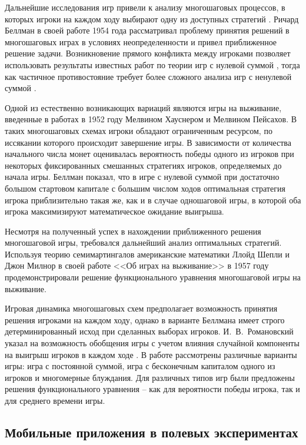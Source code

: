 Дальнейшие исследования игр привели к анализу многошаговых процессов, в которых игроки на каждом ходу выбирают одну из доступных стратегий \cite{bellman_decision_1954}. Ричард Беллман в своей работе 1954 года рассматривал проблему принятия решений в многошаговых играх в условиях неопределенности \cite{bellman_decision-making_1954} и привел приближенное решение задачи. Возникновение прямого конфликта между игроками позволяет использовать результаты известных работ по теории игр с нулевой суммой \cite{nash_non-cooperative_1951}, тогда как частичное противостояние требует более сложного анализа игр с ненулевой суммой \cite{bellman_non-zero_1949}. 

Одной из естественно возникающих вариаций являются игры на выживание, введенные в работах \cite{hausner_games_1952,peisakoff_more_1952} в 1952 году Мелвином Хауснером и Мелвином Пейсахов. В таких многошаговых схемах игроки обладают ограниченным ресурсом, по иссякании которого происходит завершение игры. В зависимости от количества начального числа монет оценивалась вероятность победы одного из игроков при некоторых фиксированных смешанных стратегиях игроков, определяемых до начала игры. Беллман показал, что в игре с нулевой суммой при достаточно большом стартовом капитале с большим числом ходов оптимальная стратегия игрока приблизительно такая же, как и в случае одношаговой игры, в которой оба игрока максимизируют математическое ожидание выигрыша. 

Несмотря на полученный успех в нахождении приближенного решения многошаговой игры, требовался дальнейший анализ оптимальных стратегий. Используя теорию семимартингалов американские математики Ллойд Шепли и Джон Милнор в своей работе <<Об играх на выживание>> в 1957 году \cite{milnor_games_1956} продемонстрировали решение функционального уравнения многошаговой игры на выживание. 

Игровая динамика многошаговых схем предполагает возможность принятия решения игроками на каждом ходу, однако в варианте Беллмана имеет строго детерминированный исход при сделанных выборах игроков. И.~В.~Романовский указал на возможность обобщения игры с учетом влияния случайной компоненты на выигрыш игроков в каждом ходе \cite{romanovsky_1961}. В работе рассмотрены различные варианты игры: игра с постоянной суммой, игра с бесконечным капиталом одного из игроков и многомерные блуждания. Для различных типов игр были предложены решения функционального уравнения -- как для вероятности победы игрока, так и для среднего времени игры.

\subsection{Мобильные приложения в полевых экспериментах}\label{subsec:ch1/sec3/sub3}

